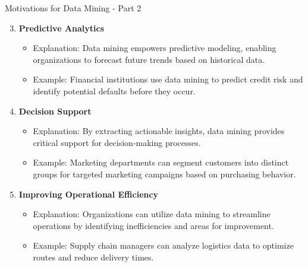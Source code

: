 \documentclass[aspectratio=169]{beamer}
\begin{document}
\begin{frame}[fragile]{Motivations for Data Mining - Part 2}
    \begin{enumerate}
        \setcounter{enumi}{2}
        \item \textbf{Predictive Analytics}  
        \begin{itemize}
            \item Explanation: Data mining empowers predictive modeling, enabling organizations to forecast future trends based on historical data.
            \item Example: Financial institutions use data mining to predict credit risk and identify potential defaults before they occur.
        \end{itemize}

        \item \textbf{Decision Support}
        \begin{itemize}
            \item Explanation: By extracting actionable insights, data mining provides critical support for decision-making processes.
            \item Example: Marketing departments can segment customers into distinct groups for targeted marketing campaigns based on purchasing behavior.
        \end{itemize}

        \item \textbf{Improving Operational Efficiency}
        \begin{itemize}
            \item Explanation: Organizations can utilize data mining to streamline operations by identifying inefficiencies and areas for improvement.
            \item Example: Supply chain managers can analyze logistics data to optimize routes and reduce delivery times.
        \end{itemize}
    \end{enumerate}
\end{frame}
\end{document}
